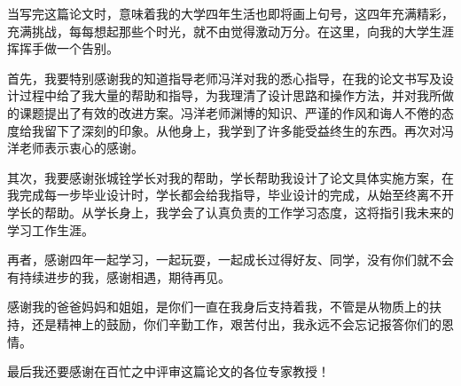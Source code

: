 \documentclass[
  ]{njuthesis}
\begin{document}
%   
%   






%





\printbibliography


\begin{acknowledgement}
  当写完这篇论文时，意味着我的大学四年生活也即将画上句号，这四年充满精彩，充满挑战，每每想起那些个时光，就不由觉得激动万分。在这里，向我的大学生涯挥挥手做一个告别。
  
  首先，我要特别感谢我的知道指导老师冯洋对我的悉心指导，在我的论文书写及设计过程中给了我大量的帮助和指导，为我理清了设计思路和操作方法，并对我所做的课题提出了有效的改进方案。冯洋老师渊博的知识、严谨的作风和诲人不倦的态度给我留下了深刻的印象。从他身上，我学到了许多能受益终生的东西。再次对冯洋老师表示衷心的感谢。
  
  其次，我要感谢张城铨学长对我的帮助，学长帮助我设计了论文具体实施方案，在我完成每一步毕业设计时，学长都会给我指导，毕业设计的完成，从始至终离不开学长的帮助。从学长身上，我学会了认真负责的工作学习态度，这将指引我未来的学习工作生涯。
  
  再者，感谢四年一起学习，一起玩耍，一起成长过得好友、同学，没有你们就不会有持续进步的我，感谢相遇，期待再见。
  
  感谢我的爸爸妈妈和姐姐，是你们一直在我身后支持着我，不管是从物质上的扶持，还是精神上的鼓励，你们辛勤工作，艰苦付出，我永远不会忘记报答你们的恩情。
  
  最后我还要感谢在百忙之中评审这篇论文的各位专家教授！
\end{acknowledgement}




\end{document}
